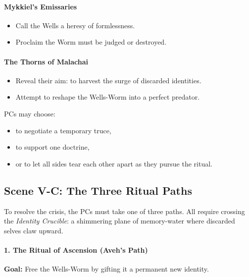 \documentclass[11pt]{book}
\begin{document}
\paragraph{Mykkiel's Emissaries}
\begin{itemize}
    \item Call the Wells a heresy of formlessness.
    \item Proclaim the Worm must be judged or destroyed.
\end{itemize}

\paragraph{The Thorns of Malachai}
\begin{itemize}
    \item Reveal their aim: to harvest the surge of discarded identities.
    \item Attempt to reshape the Wells-Worm into a perfect predator.
\end{itemize}

PCs may choose:
\begin{itemize}
    \item to negotiate a temporary truce,
    \item to support one doctrine,
    \item or to let all sides tear each other apart as they pursue the ritual.
\end{itemize}

\subsection*{Scene V-C: The Three Ritual Paths}

To resolve the crisis, the PCs must take one of three paths.
All require crossing the \emph{Identity Crucible}: a shimmering plane
of memory-water where discarded selves claw upward.

\paragraph{1. The Ritual of Ascension (Aveh's Path)}

\textbf{Goal:} Free the Wells-Worm by gifting it a permanent new identity.
\end{document}
